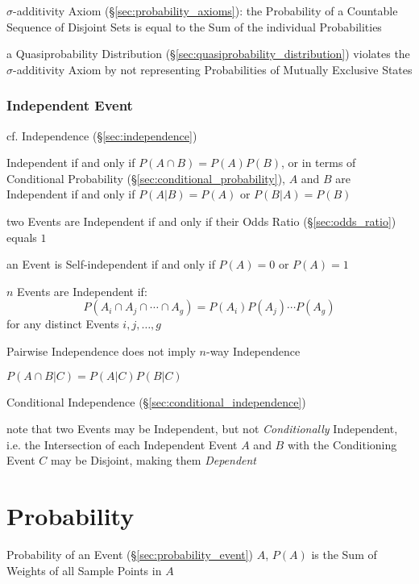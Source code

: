 $\sigma$-additivity Axiom (\S\ref{sec:probability_axioms}): the Probability of
a Countable Sequence of Disjoint Sets is equal to the Sum of the individual
Probabilities

a Quasiprobability Distribution (\S\ref{sec:quasiprobability_distribution})
violates the $\sigma$-additivity Axiom by not representing Probabilities of
Mutually Exclusive States



\subsubsection{Independent Event}\label{sec:independent_event}

\fist cf. Independence (\S\ref{sec:independence})

Independent if and only if $P(A \cap B) = P(A) P(B)$, or in terms of Conditional
Probability (\S\ref{sec:conditional_probability}), $A$ and $B$ are Independent
if and only if $P(A|B) = P(A)$ or $P(B|A) = P(B)$

\fist two Events are Independent if and only if their Odds Ratio
(\S\ref{sec:odds_ratio}) equals $1$

an Event is Self-independent if and only if $P(A) = 0$ or $P(A) = 1$

$n$ Events are Independent if:
\[
  P(A_i \cap A_j \cap \cdots \cap A_g) = P(A_i)P(A_j) \cdots P(A_g)
\]
for any distinct Events $i,j,\ldots,g$

Pairwise Independence does not imply $n$-way Independence

$P(A \cap B | C) = P(A|C)P(B|C)$

\fist Conditional Independence (\S\ref{sec:conditional_independence})

note that two Events may be Independent, but not \emph{Conditionally}
Independent, i.e. the Intersection of each Independent Event $A$ and $B$ with
the Conditioning Event $C$ may be Disjoint, making them \emph{Dependent}



\section{Probability}\label{sec:probability}

Probability of an Event (\S\ref{sec:probability_event}) $A$, $P(A)$ is the Sum
of Weights of all Sample Points in $A$

